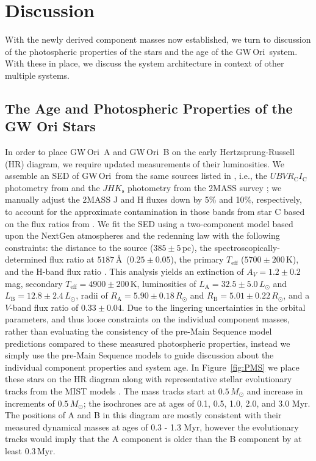 \documentclass[twocolumn]{aastex61}
\newcommand{\obj}{GW\,Ori}
\begin{document}
\section{Discussion} \label{sec:discussion}
With the newly derived component masses now established, we turn to discussion of the photospheric properties of the stars and the age of the \obj\ system. With these in place, we discuss the system architecture in context of other multiple systems.

\subsection{The Age and Photospheric Properties of the GW Ori Stars}
In order to place \obj~A and \obj~B on the early Hertzsprung-Russell (HR) diagram, we require updated measurements of their luminosities.
We assemble an SED of \obj\ from the same sources listed in \citet{fang14}, i.e., the $U B V R_\mathrm{C} I_\mathrm{C}$ photometry from \citet{calvet04} and the $JHK_\mathrm{s}$ photometry from the 2MASS survey \citep{skrutskie06}; we
manually adjust the 2MASS J and H fluxes down by 5\% and 10\%, respectively, to account for the approximate contamination in those bands from star C based on the flux ratios from \citet{berger11}. We fit the SED using a two-component model based upon the NextGen atmospheres \citep{hauschildt99} and the \citet{cardelli89} redenning law with the following constraints: the distance to the source ($385\pm 5$\,pc), the spectroscopically-determined flux ratio at $5187$\,\AA\ ($0.25 \pm 0.05$), the primary $T_\mathrm{eff}$ ($5700\pm 200$\,K), and the H-band flux ratio \citep[$f_\mathrm{B} / f_\mathrm{A} = 0.57 \pm 0.05$;][]{berger11}.
This analysis yields an extinction of $A_V = 1.2 \pm 0.2$\,mag, secondary $T_\mathrm{eff} = 4900 \pm 200$\,K,
luminosities of $L_\mathrm{A} = 32.5 \pm 5.0\,L_\odot$ and $L_\mathrm{B} = 12.8 \pm 2.4\,L_\odot$, radii of
$R_\mathrm{A} = 5.90 \pm 0.18\,R_\odot$ and $R_\mathrm{B} = 5.01 \pm 0.22\,R_\odot$, and a $V$-band flux ratio of $0.33\pm0.04$.
Due to the lingering uncertainties in the orbital parameters, and thus loose constraints on the individual component masses, rather than evaluating the consistency of the pre-Main Sequence model predictions compared to these measured photospheric properties, instead we simply use the pre-Main Sequence models to guide discussion about the individual component properties and system age. In Figure~\ref{fig:PMS} we place these stars on the HR diagram along with representative stellar evolutionary tracks from the MIST models \citep{choi16}. The mass tracks start at $0.5\,M_\odot$ and increase in increments of $0.5\,M_\odot$; the isochrones are at ages of 0.1, 0.5, 1.0, 2.0, and 3.0 Myr. The positions of A and B in this diagram are mostly consistent with their measured dynamical masses at ages of 0.3 - 1.3 Myr, however the evolutionary tracks would imply that the A component is older than the B component by at least 0.3\,Myr.
\end{document}
